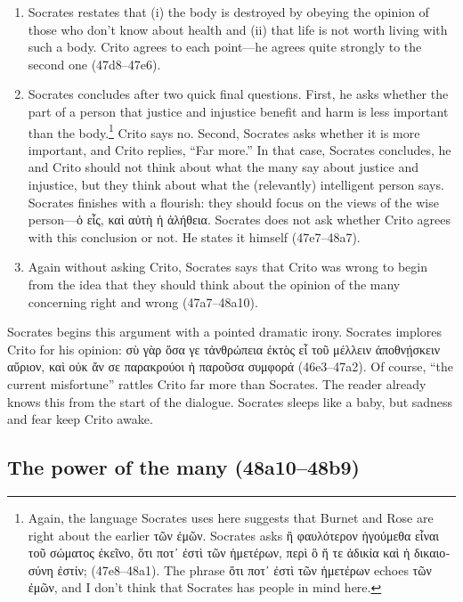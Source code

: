 \documentclass[12pt,letterpaper]{article}
\begin{document}
\begin{enumerate}
    \item Socrates restates that (i) the body is destroyed by obeying the opinion of those who don't know about health and (ii) that life is not worth living with such a body. Crito agrees to each point---he agrees quite strongly to the second one (47d8--47e6).

    \item Socrates concludes after two quick final questions. First, he asks whether the part of a person that justice and injustice benefit and harm is less important than the body.\footnote{Again, the language Socrates uses here suggests that Burnet and Rose are right about the earlier \textgreek{τῶν ἐμῶν}. Socrates asks \textgreek{ἢ φαυλότερον ἡγούμεθα εἶναι τοῦ σώματος ἐκεῖνο, ὅτι ποτ᾽ ἐστὶ τῶν ἡμετέρων, περὶ ὃ ἥ τε ἀδικία καὶ ἡ δικαιοσύνη ἐστίν;} (47e8--48a1). The phrase \textgreek{ὅτι ποτ᾽ ἐστὶ τῶν ἡμετέρων} echoes \textgreek{τῶν ἐμῶν}, and I don't think that Socrates has people in mind here.} Crito says no. Second, Socrates asks whether it is more important, and Crito replies, ``Far more.'' In that case, Socrates concludes, he and Crito should not think about what the many say about justice and injustice, but they think about what the (relevantly) intelligent person says. Socrates finishes with a flourish: they should focus on the views of the wise person---\textgreek{ὁ εἷς, καὶ αὐτὴ ἡ ἀλήθεια}. Socrates does not ask whether Crito agrees with this conclusion or not. He states it himself (47e7--48a7).

    \item Again without asking Crito, Socrates says that Crito was wrong to begin from the idea that they should think about the opinion of the many concerning right and wrong (47a7--48a10).

\end{enumerate}

Socrates begins this argument with a pointed dramatic irony. Socrates implores Crito for his opinion: \textgreek{σὺ γὰρ ὅσα γε τἀνθρώπεια ἐκτὸς εἶ τοῦ μέλλειν ἀποθνῄσκειν αὔριον, καὶ οὐκ ἄν σε παρακρούοι ἡ παροῦσα συμφορά} (46e3--47a2). Of course, ``the current misfortune'' rattles Crito far more than Socrates. The reader already knows this from the start of the dialogue. Socrates sleeps like a baby, but sadness and fear keep Crito awake.

\subsection*{The power of the many (48a10--48b9)}
\end{document}
